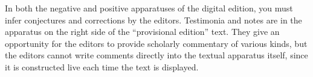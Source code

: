 In both the negative and positive apparatuses of the digital edition, you must
infer conjectures and corrections by the editors. Testimonia and notes are in the
apparatus on the right side of the “provisional edition” text.  They give an
opportunity for the editors to provide scholarly commentary of various kinds, but
the editors cannot write comments directly into the textual apparatus itself,
since it is constructed live each time the text is displayed.





